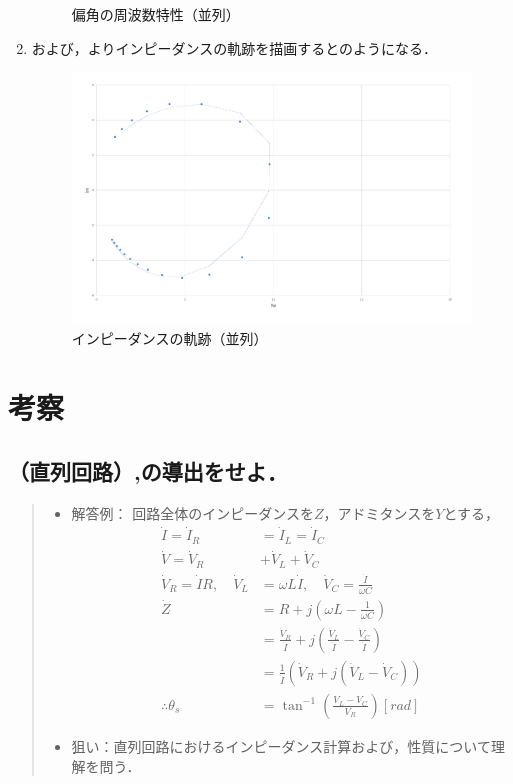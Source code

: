 \documentclass[11pt,dvipdfmx]{jarticle}
\begin{document}
\begin{enumerate}
\begin{figure}
 \caption{偏角の周波数特性（並列）}
 \label{fig:fig9}
\end{figure}
\item {}および，よりインピーダンスの軌跡を描画するとのようになる．
\begin{figure}
 \centering
 \includegraphics[scale=0.45]{./fig/fig6.pdf}
 \caption{インピーダンスの軌跡（並列）}
 \label{fig:fig10}
\end{figure}
\end{enumerate}


\section{考察}
\subsection{（直列回路）,の導出をせよ．}
\begin{quote}
\begin{itemize}
\item 解答例：
回路全体のインピーダンスを$Z$，アドミタンスを$Y$とする，\\
\begin{align*}
\dot{I}=\dot{I}_{R}&=\dot{I}_{L}=\dot{I}_{C}\\
\dot{V}=\dot{V}_{R}&+\dot{V}_L+\dot{V}_{C}\\
\dot{V}_{R}=\dot{I}R,\quad \dot{V}_{L}&=\omega L\dot{I},\quad \dot{V}_{C}=\frac{\dot{I}}{\omega C}\\
\dot{Z}&=R+j\left(\omega L-\frac{1}{\omega C}\right)\\
&=\frac{\dot{V}_{R}}{\dot{I}}+j\left(\frac{\dot{V}_L}{\dot{I}}-\frac{\dot{V}_C}{\dot{I}}\right)\\
&=\frac{1}{\dot{I}}\left(\dot{V}_R+j\left(\dot{V}_L-\dot{V}_C\right)\right)\\
\therefore \theta_s&=\tan^{-1}\left(\frac{V_L-V_C}{V_R}\right)[rad]
\end{align*}
\item 狙い：直列回路におけるインピーダンス計算および，性質について理解を問う．
\end{itemize}
\end{quote}
\end{document}
